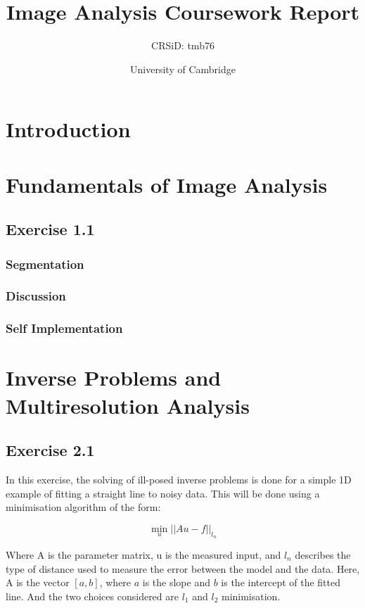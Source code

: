 \documentclass[12pt]{report} %
\title{Image Analysis Coursework Report}
\author{CRSiD: tmb76}
\date{University of Cambridge}
\begin{document}
\maketitle

\tableofcontents

\chapter*{Introduction}

\chapter{Fundamentals of Image Analysis}

\section{Exercise 1.1}

\subsection{Segmentation}

\subsection{Discussion}

\subsection{Self Implementation}


\chapter{Inverse Problems and Multiresolution Analysis}

\section{Exercise 2.1}

In this exercise, the solving of ill-posed inverse problems is done for a simple 1D example of fitting a straight line to noisy data. This will be done using a minimisation algorithm of the form:

\begin{equation}
    \min_{u} ||Au - f||_{l_{n}}
\end{equation}

Where A is the parameter matrix, u is the measured input, and $l_{n}$ describes the type of distance used to measure the error between the model and the data. Here, A is the vector $[a, b]$, where $a$ is the slope and $b$ is the intercept of the fitted line. And the two choices considered are $l_{1}$ and $l_{2}$ minimisation.
\end{document}
